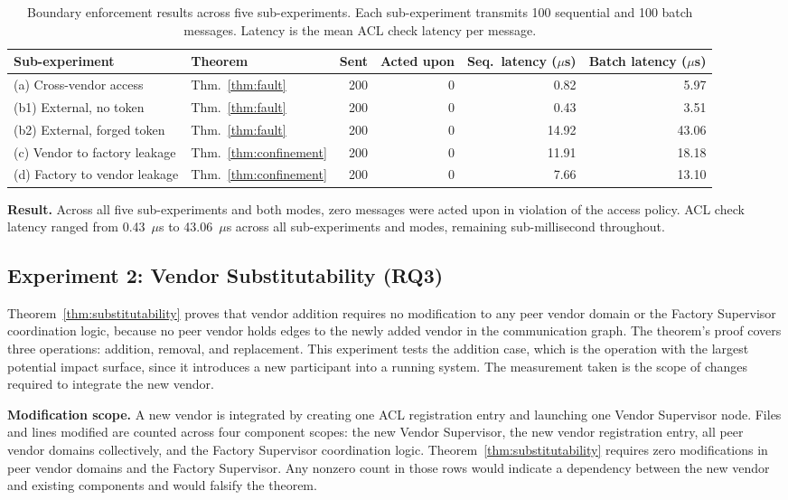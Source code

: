 \documentclass[a4paper,fleqn]{cas-dc}
\begin{document}
\begin{table}[h]
\centering
\caption{Boundary enforcement results across five sub-experiments. Each sub-experiment transmits 100 sequential and 100 batch messages. Latency is the mean ACL check latency per message.}
\label{tab:boundary}
\begin{tabular}{llrrrr}
\toprule
\textbf{Sub-experiment} & \textbf{Theorem} & \textbf{Sent} & \textbf{Acted upon} & \textbf{Seq.\ latency ($\mu$s)} & \textbf{Batch latency ($\mu$s)} \\
\midrule
(a) Cross-vendor access         & Thm.~\ref{thm:fault}       & 200 & 0 &  0.82 &  5.97 \\
(b1) External, no token         & Thm.~\ref{thm:fault}       & 200 & 0 &  0.43 &  3.51 \\
(b2) External, forged token     & Thm.~\ref{thm:fault}       & 200 & 0 & 14.92 & 43.06 \\
(c) Vendor to factory leakage   & Thm.~\ref{thm:confinement} & 200 & 0 & 11.91 & 18.18 \\
(d) Factory to vendor leakage   & Thm.~\ref{thm:confinement} & 200 & 0 &  7.66 & 13.10 \\
\bottomrule
\end{tabular}
\end{table}

\textbf{Result.} Across all five sub-experiments and both modes, zero messages were acted upon in violation of the access policy. ACL check latency ranged from 0.43~$\mu$s to 43.06~$\mu$s across all sub-experiments and modes, remaining sub-millisecond throughout.

\subsection{Experiment 2: Vendor Substitutability (RQ3)}

Theorem~\ref{thm:substitutability} proves that vendor addition requires no modification to any peer vendor domain or the Factory Supervisor coordination logic, because no peer vendor holds edges to the newly added vendor in the communication graph. The theorem's proof covers three operations: addition, removal, and replacement. This experiment tests the addition case, which is the operation with the largest potential impact surface, since it introduces a new participant into a running system. The measurement taken is the scope of changes required to integrate the new vendor.

\textbf{Modification scope.} A new vendor is integrated by creating one ACL registration entry and launching one Vendor Supervisor node. Files and lines modified are counted across four component scopes: the new Vendor Supervisor, the new vendor registration entry, all peer vendor domains collectively, and the Factory Supervisor coordination logic. Theorem~\ref{thm:substitutability} requires zero modifications in peer vendor domains and the Factory Supervisor. Any nonzero count in those rows would indicate a dependency between the new vendor and existing components and would falsify the theorem.
\end{document}
